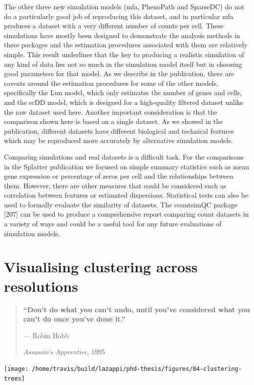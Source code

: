 \documentclass[11pt,a4paper,titlepage,twoside,openright]{style/unimelbthesis}
\theoremstyle{definition}
\theoremstyle{definition}
\theoremstyle{definition}
\theoremstyle{remark}
\begin{document}
\begin{mainmatter}
The other three new simulation models (mfa, PhenoPath and SparseDC) do not do a particularly good job of reproducing this dataset, and in particular mfa produces a dataset with a very different number of counts per cell. These simulations have mostly been designed to demonstrate the analysis methods in these packages and the estimation procedures associated with them are relatively simple. This result underlines that the key to producing a realistic simulation of any kind of data lies not so much in the simulation model itself but in choosing good parameters for that model. As we describe in the publication, there are caveats around the estimation procedures for some of the other models, specifically the Lun model, which only estimates the number of genes and cells, and the scDD model, which is designed for a high-quality filtered dataset unlike the raw dataset used here. Another important consideration is that the comparison shown here is based on a single dataset. As we showed in the publication, different datasets have different biological and technical features which may be reproduced more accurately by alternative simulation models.

Comparing simulations and real datasets is a difficult task. For the comparisons in the Splatter publication we focused on simple summary statistics such as mean gene expression or percentage of zeros per cell and the relationships between them. However, there are other measures that could be considered such as correlation between features or estimated dispersions. Statistical tests can also be used to formally evaluate the similarity of datasets. The countsimQC package {[}207{]} can be used to produce a comprehensive report comparing count datasets in a variety of ways and could be a useful tool for any future evaluations of simulation models.

\hypertarget{clust-trees}{%
\chapter{Visualising clustering across resolutions}\label{clust-trees}}

\begin{quote}
\textbf{\enquote{Don't do what you can't undo, until you've considered what you can't do once you've done it.}}

--- Robin Hobb

\emph{Assassin's Apprentice}, 1995
\end{quote}

\begin{center}\texttt{[image: /home/travis/build/lazappi/phd-thesis/figures/04-clustering-trees]} \end{center}


\end{mainmatter}
\end{document}
